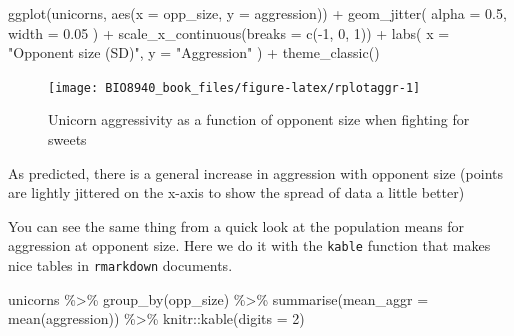 \documentclass[
  12pt,
]{book}
\newenvironment{Shaded}{\begin{snugshade}}{\end{snugshade}}
\newcommand{\AttributeTok}[1]{\textcolor[rgb]{0.77,0.63,0.00}{#1}}
\newcommand{\DecValTok}[1]{\textcolor[rgb]{0.00,0.00,0.81}{#1}}
\newcommand{\FloatTok}[1]{\textcolor[rgb]{0.00,0.00,0.81}{#1}}
\newcommand{\FunctionTok}[1]{\textcolor[rgb]{0.00,0.00,0.00}{#1}}
\newcommand{\NormalTok}[1]{#1}
\newcommand{\SpecialCharTok}[1]{\textcolor[rgb]{0.00,0.00,0.00}{#1}}
\newcommand{\StringTok}[1]{\textcolor[rgb]{0.31,0.60,0.02}{#1}}
\begin{document}
\begin{Shaded}
\begin{Highlighting}[]
\FunctionTok{ggplot}\NormalTok{(unicorns, }\FunctionTok{aes}\NormalTok{(}\AttributeTok{x =}\NormalTok{ opp\_size, }\AttributeTok{y =}\NormalTok{ aggression)) }\SpecialCharTok{+}
  \FunctionTok{geom\_jitter}\NormalTok{(}
    \AttributeTok{alpha =} \FloatTok{0.5}\NormalTok{,}
    \AttributeTok{width =} \FloatTok{0.05}
\NormalTok{  ) }\SpecialCharTok{+}
  \FunctionTok{scale\_x\_continuous}\NormalTok{(}\AttributeTok{breaks =} \FunctionTok{c}\NormalTok{(}\SpecialCharTok{{-}}\DecValTok{1}\NormalTok{, }\DecValTok{0}\NormalTok{, }\DecValTok{1}\NormalTok{)) }\SpecialCharTok{+}
  \FunctionTok{labs}\NormalTok{(}
    \AttributeTok{x =} \StringTok{"Opponent size (SD)"}\NormalTok{,}
    \AttributeTok{y =} \StringTok{"Aggression"}
\NormalTok{  ) }\SpecialCharTok{+}
  \FunctionTok{theme\_classic}\NormalTok{()}
\end{Highlighting}
\end{Shaded}

\begin{figure}

{\centering \texttt{[image: BIO8940\_book\_files/figure-latex/rplotaggr-1]} 

}

\caption{Unicorn aggressivity as a function of opponent size when fighting for sweets}\label{fig:rplotaggr}
\end{figure}

As predicted, there is a general increase in aggression with opponent size (points are lightly jittered on the x-axis to show the spread of data a little better)

You can see the same thing from a quick look at the population means for aggression at opponent size. Here we do it with the \texttt{kable} function that makes nice tables in \texttt{rmarkdown} documents.

\begin{Shaded}
\begin{Highlighting}[]
\NormalTok{unicorns }\SpecialCharTok{\%\textgreater{}\%}
  \FunctionTok{group\_by}\NormalTok{(opp\_size) }\SpecialCharTok{\%\textgreater{}\%}
  \FunctionTok{summarise}\NormalTok{(}\AttributeTok{mean\_aggr =} \FunctionTok{mean}\NormalTok{(aggression)) }\SpecialCharTok{\%\textgreater{}\%}
\NormalTok{  knitr}\SpecialCharTok{::}\FunctionTok{kable}\NormalTok{(}\AttributeTok{digits =} \DecValTok{2}\NormalTok{)}
\end{Highlighting}
\end{Shaded}
\end{document}
